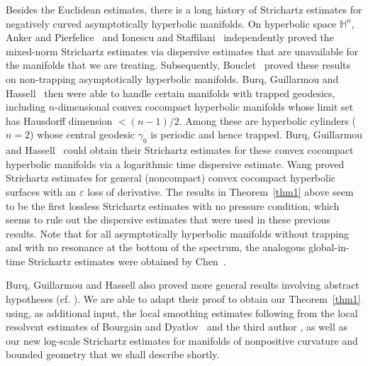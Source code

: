 \documentclass[10pt]{amsart}
\renewcommand{\epsilon}{\varepsilon}
\newcommand{\1}{{\bf 1}}
\renewcommand{\epsilon}{\varepsilon}
\begin{document}
Besides the Euclidean estimates, there is a long history of Strichartz estimates for negatively curved asymptotically
hyperbolic manifolds.  On hyperbolic space ${\mathbb H}^n$, Anker and Pierfelice~\cite{AnPier}
and Ionescu and Staffilani~\cite{IoSt} independently proved the mixed-norm Strichartz
estimates via dispersive estimates that are unavailable for the manifolds that we are treating.
Subsequently, Bouclet~\cite{Boust} proved these results on
non-trapping asymptotically hyperbolic manifolds. Burq, Guillarmou and Hassell~\cite{BGH} then
were able to handle certain manifolds with trapped geodesics, including $n$-dimensional convex
cocompact hyperbolic manifolds whose limit set has Hausdorff dimension $<(n-1)/2$.  Among these
are hyperbolic cylinders ($n=2$) whose central geodesic $\gamma_0$ is periodic and hence
trapped. Burq, Guillarmou and Hassell~\cite{BGH} could obtain their Strichartz estimates for
these convex cocompact hyperbolic manifolds via a logarithmic time dispersive estimate.  Wang \cite{WangJ} proved Strichartz estimates for general (noncompact) convex cocompact hyperbolic surfaces with an $\epsilon$ loss of derivative. The results in Theorem~\ref{thm1}
above seem to be the first lossless Strichartz estimates with no pressure condition, which seems
to rule out the dispersive estimates that were used in these previous results. Note that for all asymptotically hyperbolic manifolds without trapping and with no resonance at the bottom of the spectrum, the analogous global-in-time Strichartz estimates were obtained by Chen~\cite{ChenSt}.


Burq, Guillarmou and Hassell also proved more general results involving
abstract hypotheses (cf. \cite[Theorem 3.3]{BGH}).  We are able to adapt their proof to obtain
our Theorem~\ref{thm1} using, as additional input, the local smoothing estimates following
from the local resolvent estimates of Bourgain and Dyatlov~\cite{bourgain2018spectral}
and the third author \cite{tao2024spectral}, as well as our new log-scale Strichartz estimates
for manifolds of nonpositive curvature and bounded geometry that we shall describe shortly.
\end{document}
